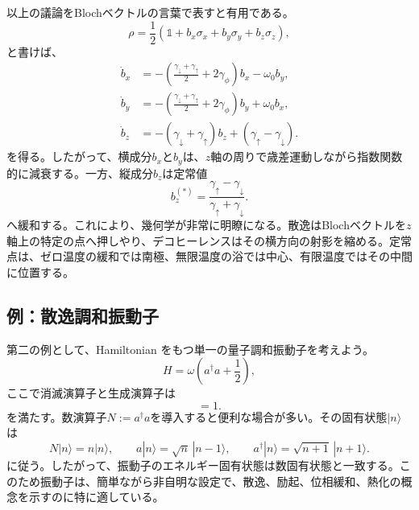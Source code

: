 \documentclass[a4paper,11pt,oneside]{article}
\theoremstyle{definition}
\numberwithin{equation}{section}
\begin{document}
以上の議論をBlochベクトルの言葉で表すと有用である。
\begin{equation}
\rho = \frac12(\mathds{1}  + b_x\sigma_x+b_y\sigma_y+b_z\sigma_z) ,
\end{equation}
と書けば、
\begin{align}
\dot b_x
&=
-\left(\frac{\gamma_\downarrow+\gamma_\uparrow}{2}+2\gamma_\phi\right)b_x - \omega_0 b_y ,
\\
\dot b_y
&=
-\left(\frac{\gamma_\downarrow+\gamma_\uparrow}{2}+2\gamma_\phi\right)b_y + \omega_0 b_x ,
\\
\dot b_z
&=
-(\gamma_\downarrow+\gamma_\uparrow)b_z + (\gamma_\uparrow-\gamma_\downarrow) .
\end{align}
を得る。したがって、横成分$b_x$と$b_y$は、$z$軸の周りで歳差運動しながら指数関数的に減衰する。一方、縦成分$b_z$は定常値
\begin{equation}
b_z^{(\ast)}
=
\frac{\gamma_\uparrow-\gamma_\downarrow}{\gamma_\uparrow+\gamma_\downarrow} .
\end{equation}
へ緩和する。これにより、幾何学が非常に明瞭になる。散逸はBlochベクトルを$z$軸上の特定の点へ押しやり、デコヒーレンスはその横方向の射影を縮める。定常点は、ゼロ温度の緩和では南極、無限温度の浴では中心、有限温度ではその中間に位置する。





\subsection{例：散逸調和振動子}



第二の例として、Hamiltonian
をもつ単一の量子調和振動子を考えよう。
\begin{equation}
H = \omega \left(a^\dagger a + \frac12\right) ,
\end{equation}
ここで消滅演算子と生成演算子は
\begin{equation}
[a,a^\dagger]=1 .
\end{equation}
を満たす。数演算子$  N := a^\dagger a  $を導入すると便利な場合が多い。その固有状態$|n\rangle$は
\begin{equation}
N|n\rangle = n|n\rangle ,
\qquad
a|n\rangle = \sqrt{n}\,|n-1\rangle ,
\qquad
a^\dagger|n\rangle = \sqrt{n+1}\,|n+1\rangle .
\end{equation}
に従う。したがって、振動子のエネルギー固有状態は数固有状態と一致する。このため振動子は、簡単ながら非自明な設定で、散逸、励起、位相緩和、熱化の概念を示すのに特に適している。
\end{document}
